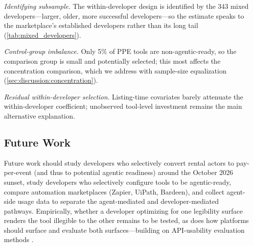 \emph{Identifying subsample.} The within-developer design is identified by the
343 mixed developers---larger, older, more successful developers---so the
estimate speaks to the marketplace's established developers rather than its long
tail (\autoref{tab:mixed_developers}).

\emph{Control-group imbalance.} Only 5\% of PPE tools are non-agentic-ready, so
the comparison group is small and potentially selected; this most affects the
concentration comparison, which we address with sample-size equalization
(\autoref{sec:discussion:concentration}).

\emph{Residual within-developer selection.} Listing-time covariates barely
attenuate the within-developer coefficient; unobserved tool-level investment
remains the main alternative explanation.

\subsection{Future Work}
\label{sec:discussion:future}

Future work should study developers who selectively convert rental actors to
pay-per-event (and thus to potential agentic readiness) around the October 2026
sunset, study developers who selectively configure tools to be agentic-ready,
compare automation marketplaces (Zapier, UiPath, Bardeen), and collect
agent-side usage data to separate the agent-mediated and developer-mediated
pathways. Empirically, whether a developer optimizing for one legibility surface
renders the tool illegible to the other remains to be tested, as does how
platforms should surface and evaluate both surfaces---building on API-usability
evaluation methods \cite{myers2016api}.
